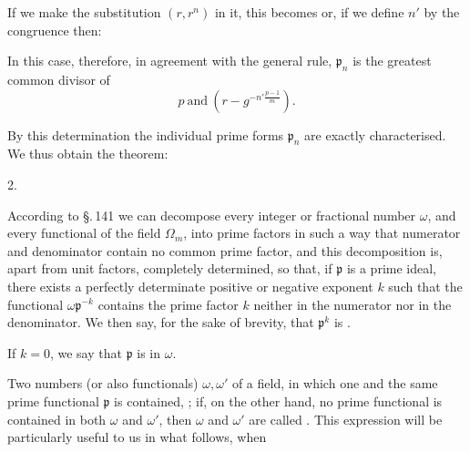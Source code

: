 If we make the substitution $(r, r^n)$ in it, this becomes
or, if we define $n'$ by the congruence
then:

In this case, therefore, in agreement with the general
 rule, $\mathfrak p_n$ is the greatest common divisor of
\[
p \ \text{and} \ \left(r - g^{-n'\frac{p-1}{m}}\right).
\]

By this determination the individual prime forms $\mathfrak p_n$
are exactly characterised. We thus obtain the theorem:

2. 

According to \S.\,141 we can decompose every integer or fractional
number $\omega$, and every functional of the field $\Omega_m$, into prime
 factors in such a way that numerator and denominator contain
 no common prime factor, and this decomposition is,
apart from unit factors, completely determined, so that, if
$\mathfrak p$ is a prime ideal, there exists a perfectly determinate positive
or negative exponent $k$ such that the functional $\omega \mathfrak p^{-k}$ contains
 the prime factor $k$ neither in the numerator nor in the denominator. %
We then say,
for the sake of brevity, that $\mathfrak p^k$ is .

If $k=0$, we say that $\mathfrak p$ is  in $\omega$.

Two numbers (or also functionals) $\omega, \omega'$ of a field, in
which one and the same prime functional $\mathfrak p$ is contained, ; if, on the other hand,
no prime functional is contained in both $\omega$ and $\omega'$, then
$\omega$ and $\omega'$ are called . This expression
will be particularly useful to us in what follows, when

